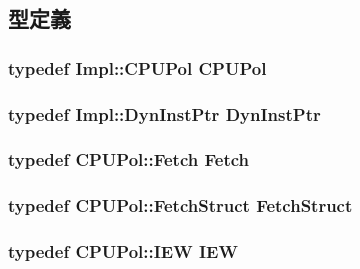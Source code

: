 \subsection{型定義}
\hypertarget{classDefaultCommit_a87d662eaeb9eab249d671b63cb4ba11a}{
\subsubsection[{CPUPol}]{\setlength{\rightskip}{0pt plus 5cm}typedef Impl::CPUPol {\bf CPUPol}}}
\label{classDefaultCommit_a87d662eaeb9eab249d671b63cb4ba11a}
\hypertarget{classDefaultCommit_a028ce10889c5f6450239d9e9a7347976}{
\subsubsection[{DynInstPtr}]{\setlength{\rightskip}{0pt plus 5cm}typedef Impl::DynInstPtr {\bf DynInstPtr}}}
\label{classDefaultCommit_a028ce10889c5f6450239d9e9a7347976}
\hypertarget{classDefaultCommit_aea27de1f675f508e1eb618ac115ce05c}{
\subsubsection[{Fetch}]{\setlength{\rightskip}{0pt plus 5cm}typedef CPUPol::Fetch {\bf Fetch}}}
\label{classDefaultCommit_aea27de1f675f508e1eb618ac115ce05c}
\hypertarget{classDefaultCommit_a3aac8607069f16898ef53cfaa2d97aeb}{
\subsubsection[{FetchStruct}]{\setlength{\rightskip}{0pt plus 5cm}typedef CPUPol::FetchStruct {\bf FetchStruct}}}
\label{classDefaultCommit_a3aac8607069f16898ef53cfaa2d97aeb}
\hypertarget{classDefaultCommit_a2e298f790f528754f0e0ffa0cb8088f6}{
\subsubsection[{IEW}]{\setlength{\rightskip}{0pt plus 5cm}typedef CPUPol::IEW {\bf IEW}}}
